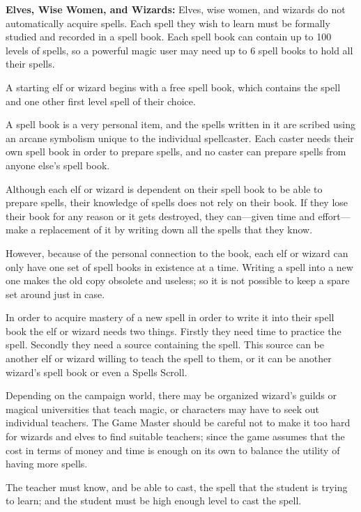 \begin{multicols*}{2}
\textbf{Elves, Wise Women, and Wizards:} Elves, wise women, and wizards do not automatically acquire spells. Each spell they wish to learn must be formally studied and recorded in a spell book. Each spell book can contain up to 100 levels of spells, so a powerful magic user may need up to 6 spell books to hold all their spells.

A starting elf or wizard begins with a free spell book, which contains the  spell and one other first level spell of their choice.

A spell book is a very personal item, and the spells written in it are scribed using an arcane symbolism unique to the individual spellcaster. Each caster needs their own spell book in order to prepare spells, and no caster can prepare spells from anyone else’s spell book.

Although each elf or wizard is dependent on their spell book to be able to prepare spells, their knowledge of spells does not rely on their book. If they lose their book for any reason or it gets destroyed, they can—given time and effort—make a replacement of it by writing down all the spells that they know.

However, because of the personal connection to the book, each elf or wizard can only have one set of spell books in existence at a time. Writing a spell into a new one makes the old copy obsolete and useless; so it is not possible to keep a spare set around just in case.

In order to acquire mastery of a new spell in order to write it into their spell book the elf or wizard needs two things. Firstly they need time to practice the spell. Secondly they need a source containing the spell. This source can be another elf or wizard willing to teach the spell to them, or it can be another wizard’s spell book or even a Spells Scroll.

Depending on the campaign world, there may be organized wizard’s guilds or magical universities that teach magic, or characters may have to seek out individual teachers. The Game Master should be careful not to make it too hard for wizards and elves to find suitable teachers; since the game assumes that the cost in terms of money and time is enough on its own to balance the utility of having more spells.

The teacher must know, and be able to cast, the spell that the student is trying to learn; and the student must be high enough level to cast the spell.


\end{multicols*}
